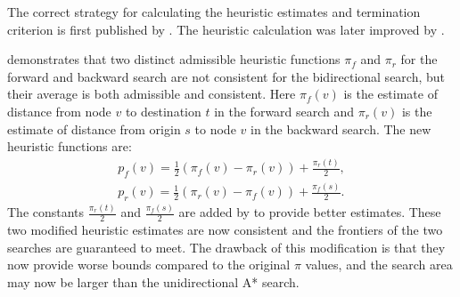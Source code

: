 The correct strategy for calculating the heuristic estimates and termination criterion is first published by \citet{Pohl}.
The heuristic calculation was later improved by \citet{Ikeda}.

\begin{comment}
\begin{figure}[H]
    \tikzstyle{main node} = [circle, draw, text centered, minimum height=2.5em]
    \tikzstyle{line} = [draw, -latex']
    \centering
    \begin{tikzpicture}[>=stealth', line width=1pt, auto, node distance=3cm]
        \node [main node] (s) at (0,0)  {s};
        \node [main node] (v) at (2,3)  {v};
        \node [main node] (w) at (7,4)  {w};
        \node [main node] (t) at (8,7)  {t};

        \path [line, dashed] (s) -- node [right] {$\pi_r(v)$} (v);
        \path [line, dashed] (s) -- node [right] {$\pi_r(w)$} (w);
        \path [line, dashed] (v) -- node {$\pi_f(v)$} (t);
        \path [line, dashed] (w) -- node [left] {$\pi_f(w)$} (t);

        \draw [line, out=300, in=200, bend left] (s.north) to node [left] {$c_{st}$} (v);
        \draw [line, out=70, in=45, bend right] (w.east) to node [right] {$c_{wt}$} (t.east);
        \draw [line] (v.east) to node [above] {$c_{vw}$} (w);
    \end{tikzpicture}
    \caption{Heuristic values for bidirectional A* search}
    \label{fig:bidirect_heuristic}
\end{figure}
\todoin[inline]{add $\pi_f(t) and \pi_r(s)$ for figure}
\end{comment}

\citet{Ikeda} demonstrates that two distinct admissible heuristic functions $\pi_f$ and $\pi_r$ for the forward and backward search are not consistent for the bidirectional search, but their average is both admissible and consistent.
Here $\pi_f(v)$ is the estimate of distance from node $v$ to destination $t$ in the forward search and $\pi_r(v)$ is the estimate of distance from origin $s$ to node $v$ in the backward search. 
The new heuristic functions are:
\begin{align}
    p_f(v) = \frac{1}{2}(\pi_f(v)-\pi_r(v)) + \frac{\pi_r(t)}{2}, \\
    p_r(v) = \frac{1}{2}(\pi_r(v)-\pi_f(v)) + \frac{\pi_f(s)}{2}.
\end{align}
The constants $\frac{\pi_r(t)}{2}$ and $\frac{\pi_f(s)}{2}$ are added by \citet{GoldbergEPP} to provide better estimates.
These two modified heuristic estimates are now consistent and the frontiers of the two searches are guaranteed to meet.
The drawback of this modification is that they now provide worse bounds compared to the original $\pi$ values,
and the search area may now be larger than the unidirectional A* search.

